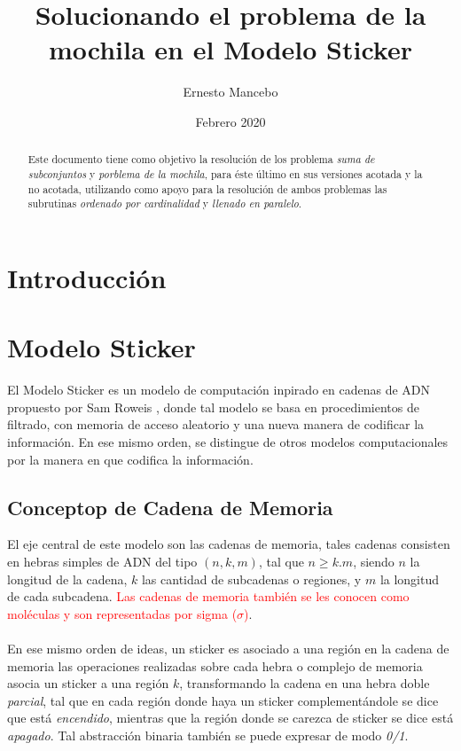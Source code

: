 \documentclass[12pt, letterpaper, twoside]{article}
\title{Solucionando el problema de la mochila en el Modelo Sticker}
\author{Ernesto Mancebo}
\date{Febrero 2020}
\begin{document}
    \maketitle
    \begin{abstract}
        Este documento tiene como objetivo la resolución de los problema \emph{suma de subconjuntos} y \emph{porblema de la mochila}, para éste último en sus versiones acotada y la no acotada, utilizando como apoyo para la resolución de ambos problemas las subrutinas \emph{ordenado por cardinalidad} y \emph{llenado en paralelo}.
    \end{abstract}

    \newpage
    \section{Introducción}

    \section{Modelo Sticker}
    El Modelo Sticker es un modelo de computación inpirado en cadenas de ADN propuesto por Sam Roweis \textcolor{red}{\cite{article}}, donde tal modelo se basa en procedimientos de filtrado, con memoria de acceso aleatorio y una nueva manera de codificar la información. En ese mismo orden, se distingue de otros modelos computacionales por la manera en que codifica la información.

    \subsection{Conceptop de Cadena de Memoria}
    El eje central de este modelo son las cadenas de memoria, tales cadenas consisten en hebras simples de ADN del tipo $(n, k, m)$, tal que $n\geq k.m$, siendo $n$ la longitud de la cadena, $k$ las cantidad de subcadenas o regiones, y $m$ la longitud de cada subcadena.\textcolor{red}{ Las cadenas de memoria también se les conocen como moléculas y son representadas por sigma ($\sigma$)}. \\ \\
    En ese mismo orden de ideas, un sticker es asociado a una región en la cadena de memoria
    las operaciones realizadas sobre cada hebra o complejo de memoria asocia un sticker a una región $k$, transformando la cadena en una hebra doble \emph{parcial}, tal que en cada región donde haya un sticker complementándole se dice que está \emph{encendido}, mientras que la región donde se carezca de sticker se dice está \emph{apagado}. Tal abstracción binaria también se puede expresar de modo \emph{0/1}.
\end{document}
